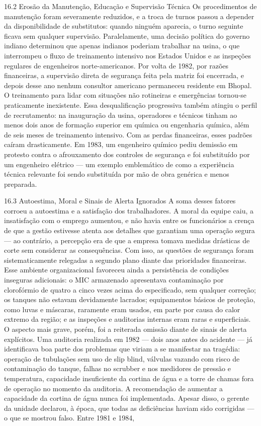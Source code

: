 16.2 Erosão da Manutenção, Educação e Supervisão Técnica Os procedimentos de manutenção foram severamente reduzidos, e a troca de turnos passou a depender da disponibilidade de substitutos: quando ninguém aparecia, o turno seguinte ficava sem qualquer supervisão. Paralelamente, uma decisão política do governo indiano determinou que apenas indianos poderiam trabalhar na usina, o que interrompeu o fluxo de treinamento intensivo nos Estados Unidos e as inspeções regulares de engenheiros norte-americanos. Por volta de 1982, por razões financeiras, a supervisão direta de segurança feita pela matriz foi encerrada, e depois desse ano nenhum consultor americano permaneceu residente em Bhopal. O treinamento para lidar com situações não rotineiras e emergências tornou-se praticamente inexistente. Essa desqualificação progressiva também atingiu o perfil de recrutamento: na inauguração da usina, operadores e técnicos tinham ao menos dois anos de formação superior em química ou engenharia química, além de seis meses de treinamento intensivo. Com as perdas financeiras, esses padrões caíram drasticamente. Em 1983, um engenheiro químico pediu demissão em protesto contra o afrouxamento dos controles de segurança e foi substituído por um engenheiro elétrico — um exemplo emblemático de como a experiência técnica relevante foi sendo substituída por mão de obra genérica e menos preparada.

16.3 Autoestima, Moral e Sinais de Alerta Ignorados A soma desses fatores corroeu a autoestima e a satisfação dos trabalhadores. A moral da equipe caiu, a insatisfação com o emprego aumentou, e não havia entre os funcionários a crença de que a gestão estivesse atenta aos detalhes que garantiam uma operação segura — ao contrário, a percepção era de que a empresa tomava medidas drásticas de corte sem considerar as consequências. Com isso, as questões de segurança foram sistematicamente relegadas a segundo plano diante das prioridades financeiras. Esse ambiente organizacional favoreceu ainda a persistência de condições inseguras adicionais: o MIC armazenado apresentava contaminação por clorofórmio de quatro a cinco vezes acima do especificado, sem qualquer correção; os tanques não estavam devidamente lacrados; equipamentos básicos de proteção, como luvas e máscaras, raramente eram usados, em parte por causa do calor extremo da região; e as inspeções e auditorias internas eram raras e superficiais. O aspecto mais grave, porém, foi a reiterada omissão diante de sinais de alerta explícitos. Uma auditoria realizada em 1982 — dois anos antes do acidente — já identificava boa parte dos problemas que viriam a se manifestar na tragédia: operação de tubulações sem uso de slip blind, válvulas vazando com risco de contaminação do tanque, falhas no scrubber e nos medidores de pressão e temperatura, capacidade insuficiente da cortina de água e a torre de chamas fora de operação no momento da auditoria. A recomendação de aumentar a capacidade da cortina de água nunca foi implementada. Apesar disso, o gerente da unidade declarou, à época, que todas as deficiências haviam sido corrigidas — o que se mostrou falso. Entre 1981 e 1984,

